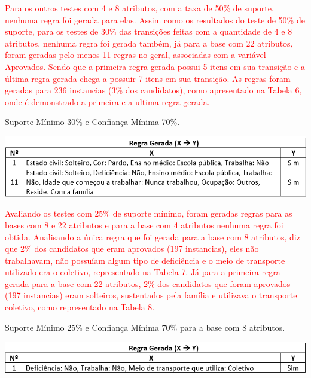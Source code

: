 \par
\textcolor{red}{Para os outros testes com 4 e 8 atributos, com a taxa de 50\% de suporte, nenhuma regra foi gerada para elas. Assim como os resultados do teste de 50\% de suporte, para os testes de 30\% das transições feitas com a quantidade de 4 e 8 atributos, nenhuma regra foi gerada também, já para a base com 22 atributos, foram geradas pelo menos 11 regras no geral, associadas com a variável Aprovados. Sendo que a primeira regra gerada possui 5 itens em sua transição e a última regra gerada chega a possuir 7 itens em sua transição. As regras foram geradas para 236 instancias (3\% dos candidatos), como apresentado na Tabela 6, onde é demonstrado a primeira e a ultima regra gerada.}

\par
\begin{table}[!htp]
	\begin{center}
    \caption{\label{fig:waveform_fig} Suporte Mínimo 30\% e Confiança Mínima 70\%.}
	\includegraphics[scale=0.75]{Figuras/Suporte_30_atributos_22.png}
	\end{center}
\end{table}


\par
\textcolor{red}{Avaliando os testes com 25\% de suporte mínimo, foram geradas regras para as bases com 8 e 22 atributos e para a base com 4 atributos nenhuma regra foi obtida. Analisando a única regra que foi gerada para a base com 8 atributos, diz que 2\% dos candidatos que eram aprovados (197 instancias), eles não trabalhavam, não possuíam algum tipo de deficiência e o meio de transporte utilizado era o coletivo, representado na Tabela 7. Já para a primeira regra gerada para a base com 22 atributos, 2\% dos candidatos que foram aprovados (197 instancias) eram solteiros, sustentados pela família e utilizava o transporte coletivo, como representado na Tabela 8.}

\par
\begin{table}[!htp]
	\begin{center}
    \caption{\label{fig:waveform_fig} Suporte Mínimo 25\% e Confiança Mínima 70\% para a base com 8 atributos.}
	\includegraphics[scale=0.75]{Figuras/Suporte_25_atributos_9.png}
	\end{center}
\end{table}

